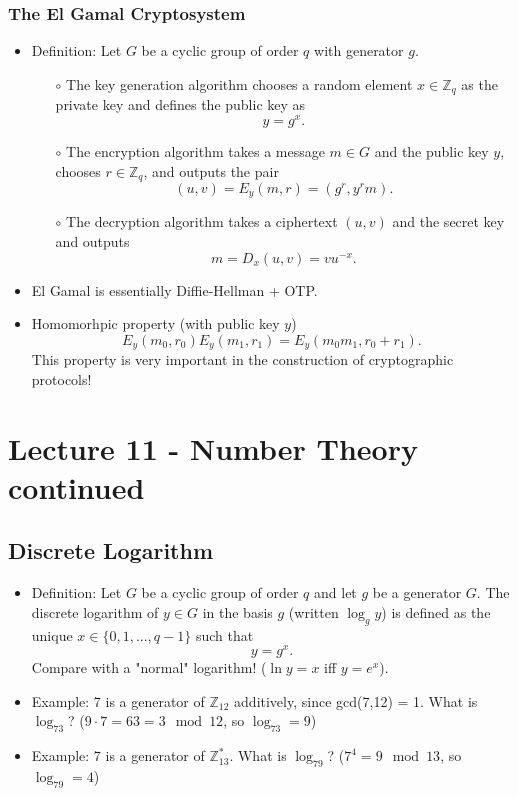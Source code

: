 \documentclass[a4paper]{scrartcl}
\begin{document}
\subsubsection*{The El Gamal Cryptosystem}

\begin{itemize}
\item Definition: Let $G$ be a cyclic group of order $q$ with generator $g$.
\begin{itemize}
\item [$\circ$] The key generation algorithm chooses a random element $x \in  \mathbb{Z}_q$ as the private key and defines the public key as $$y = g^x.$$
\item [$\circ$] The encryption algorithm takes a message $m \in G$ and the public key $y$, chooses $r \in \mathbb{Z}_q$, and outputs the pair $$(u,v) = E_y(m,r) = (g^r,y^rm).$$
\item [$\circ$] The decryption algorithm takes a ciphertext $(u,v)$ and the secret key and outputs $$m = D_x(u,v) = vu^{-x}.$$
\end{itemize}
\item El Gamal is essentially Diffie-Hellman + OTP.
\item Homomorhpic property (with public key $y$) $$E_y(m_0,r_0)E_y(m_1,r_1) = E_y(m_0m_1,r_0 +r_1).$$ This property is very important in the construction of cryptographic protocols!
\end{itemize}

\section*{Lecture 11 - Number Theory continued}

\subsection*{Discrete Logarithm}

\begin{itemize}
\item Definition: Let $G$ be a cyclic group of order $q$ and let $g$ be a generator $G$. The discrete logarithm of $y \in G$ in the basis $g$ (written $\log_gy$) is defined as the unique $x \in \{0,1,...,q-1\}$ such that $$y=g^x.$$ Compare with a "normal" logarithm! ($\ln y = x$ iff $y = e^x$).
\item Example: 7 is a generator of $\mathbb{Z}_{12}$ additively, since gcd(7,12) = 1. What is $\log_73$? ($9\cdot 7 = 63 = 3 \mod 12$, so $\log_73 = 9$)
\item Example: 7 is a generator of $\mathbb{Z}_{13}^*$. What is $\log_79$? ($7^4 = 9 \mod 13$, so $\log_79 = 4$) 
\end{itemize}
\end{document}

